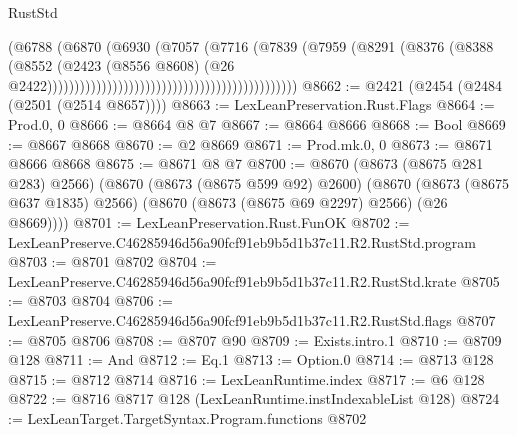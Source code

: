 \begin{lexlean}{RustStd}
\begin{coremodule}
                                                                      (@6788
                                                                        (@6870
                                                                          (@6930
                                                                            (@7057
                                                                              (@7716
                                                                                (@7839
                                                                                  (@7959
                                                                                    (@8291
                                                                                      (@8376
                                                                                        (@8388
                                                                                          (@8552
                                                                                            (@2423
                                                                                              (@8556
                                                                                                @8608)
                                                                                              (@26
                                                                                                @2422))))))))))))))))))))))))))))))))))))))))))))))
@8662 := @2421 (@2454 (@2484 (@2501 (@2514 @8657))))
@8663 := LexLeanPreservation.Rust.Flags
@8664 := Prod.{0, 0}
@8666 := @8664 @8 @7
@8667 := @8664 @8666
@8668 := Bool
@8669 := @8667 @8668
@8670 := @2 @8669
@8671 := Prod.mk.{0, 0}
@8673 := @8671 @8666 @8668
@8675 := @8671 @8 @7
@8700 := @8670
    (@8673 (@8675 @281 @283) @2566)
    (@8670
      (@8673 (@8675 @599 @92) @2600)
      (@8670 (@8673 (@8675 @637 @1835) @2566) (@8670 (@8673 (@8675 @69 @2297) @2566) (@26 @8669))))
@8701 := LexLeanPreservation.Rust.FunOK
@8702 := LexLeanPreserve.C46285946d56a90fcf91eb9b5d1b37c11.R2.RustStd.program
@8703 := @8701 @8702
@8704 := LexLeanPreserve.C46285946d56a90fcf91eb9b5d1b37c11.R2.RustStd.krate
@8705 := @8703 @8704
@8706 := LexLeanPreserve.C46285946d56a90fcf91eb9b5d1b37c11.R2.RustStd.flags
@8707 := @8705 @8706
@8708 := @8707 @90
@8709 := Exists.intro.{1}
@8710 := @8709 @128
@8711 := And
@8712 := Eq.{1}
@8713 := Option.{0}
@8714 := @8713 @128
@8715 := @8712 @8714
@8716 := LexLeanRuntime.index
@8717 := @6 @128
@8722 := @8716 @8717 @128 (LexLeanRuntime.instIndexableList @128)
@8724 := LexLeanTarget.TargetSyntax.Program.functions @8702

\end{coremodule}
\end{lexlean}
